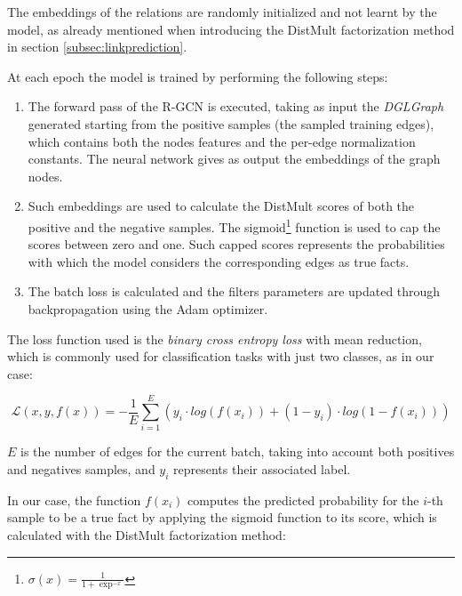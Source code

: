 \documentclass[%
    corpo=13.5pt,
    twoside,
    oldstyle,
    tipotesi=magistrale,
    greek,
    evenboxes
]{toptesi}
\begin{document}
The embeddings of the relations are randomly initialized and not learnt by the
model, as already mentioned when introducing the DistMult factorization
method in section \ref{subsec:linkprediction}.
\newline

At each epoch the model is trained by performing the following steps:

\begin{enumerate}
    \item The forward pass of the R-GCN is executed, taking as input the
        \emph{DGLGraph} generated starting from the positive samples
        (the sampled training edges), which contains both
        the nodes features and the per-edge normalization constants.
        The neural network gives as output the embeddings of the graph nodes.
    \item Such embeddings are used to calculate the DistMult scores
        of both the positive and the negative samples.
        The sigmoid\footnote{
            $\sigma(x) = \frac{1}{1+\exp^{-x}}$
        }
        function is used to cap the scores between zero and one. Such capped
        scores represents the probabilities with which the model considers the
        corresponding edges as true facts.
    \item The batch loss is calculated and the filters parameters are updated
        through backpropagation using the Adam \cite{kingma2014} optimizer.
\end{enumerate}

The loss function used is the \emph{binary cross entropy loss} with mean
reduction, which is commonly used for classification tasks with just two
classes, as in our case:

\begin{equation}
    \mathcal{L} \left( x, y, f(x) \right) =
        - \frac{1}{E} \sum_{i=1}^{E} \left(
        y_i \cdot log(f(x_i)) +
        (1-y_i) \cdot log(1-f(x_i))
    \right)
\end{equation}

$E$ is the number of edges for the current batch, taking into account both
positives and negatives samples, and $y_i$ represents their associated label.

In our case, the function $f(x_i)$ computes the predicted probability for the
$i$-th sample to be a true fact by applying the sigmoid function to its score,
which is calculated with the DistMult factorization method:
\end{document}
